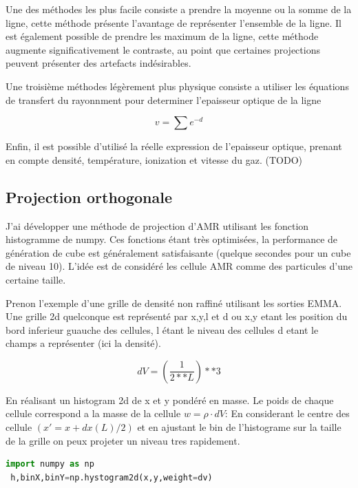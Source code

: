Une des méthodes les plus facile consiste a prendre la moyenne ou la somme de la ligne, cette méthode présente l'avantage de représenter l'ensemble de la ligne.
Il est également possible de prendre les maximum de la ligne, cette méthode augmente significativement le contraste, au point que certaines projections peuvent présenter des artefacts indésirables.

Une troisième méthodes légèrement plus physique consiste a utiliser les équations de transfert du rayonnment pour determiner l'epaisseur optique de la ligne

\begin{equation}
v= \sum e^{-d}
\end{equation}

Enfin, il est possible d'utilisé la réelle expression de l'epaisseur optique, prenant en compte densité, température, ionization et vitesse du gaz.
(TODO)


\subsection{Projection orthogonale}
J'ai développer une méthode de projection d'AMR utilisant les fonction histogramme de numpy.
Ces fonctions étant très optimisées, la performance de génération de cube est généralement satisfaisante (quelque secondes pour un cube de niveau 10).
L'idée est de considéré les cellule AMR comme des particules d'une certaine taille.

Prenon l'exemple d'une grille de densité non raffiné utilisant les sorties EMMA.
Une grille 2d  quelconque est représenté par x,y,l et d ou x,y etant les position du bord inferieur guauche des cellules, l étant le niveau des cellules d etant le champs a représenter (ici la densité).

\begin{equation}
dV= \left( \frac{1}{2**L }\right) **3
\end{equation} 

En réalisant un histogram 2d de x et y pondéré en masse.
Le poids de chaque cellule correspond a la masse de la cellule $w = \rho \cdot dV$:
En considerant le centre des cellule $(x' = x+dx(L) /2)$ et en ajustant le bin de l'histograme sur la taille de la grille on peux projeter un niveau tres rapidement.

\begin{lstlisting}[float=bth,language=python,frame=tb,caption={lprojection de l'AMR par la méthode des histogramme Numpy},label=lst:useless]
 import numpy as np
 h,binX,binY=np.hystogram2d(x,y,weight=dv)
\end{lstlisting}

